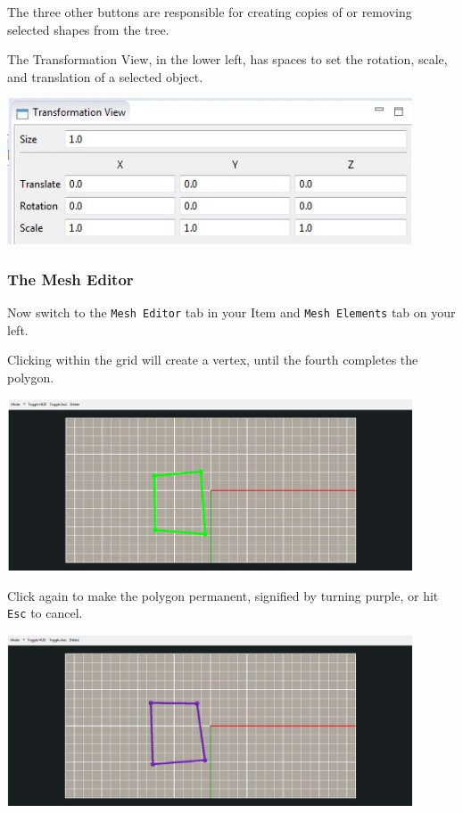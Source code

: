 \documentclass{article}
\begin{document}
The three other buttons are responsible for creating copies of or removing
selected shapes from the tree. 

The Transformation View, in the lower left, has spaces to set the rotation, scale, 
and translation of a selected object.

\begin{center}
\includegraphics[width=12cm]{images/TransformationView}
\end{center}

\subsubsection{The Mesh Editor}

Now switch to the \texttt{Mesh Editor} tab in your Item and \texttt{Mesh
Elements} tab on your left.

Clicking within the grid will create a vertex, until the fourth completes the
polygon.

\begin{center}
\includegraphics[width=12cm]{images/AddPolygon}
\end{center}

Click again to make the polygon permanent, signified by turning purple, or hit
\texttt{Esc} to cancel.

\begin{center}
\includegraphics[width=12cm]{images/NewPolygon}
\end{center}
\end{document}
